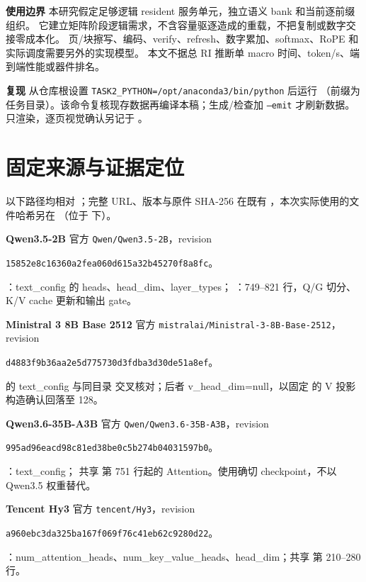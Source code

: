 \documentclass[UTF8,a4paper,11pt]{ctexart}
\newcommand{\para}[1]{\par\textbf{#1}\quad}
\begin{document}
\para{使用边界} 本研究假定足够逻辑 resident 服务单元，独立语义 bank 和当前逐前缀组织。
它建立矩阵阶段逻辑需求，不含容量驱逐造成的重载，不把复制或数字交接零成本化。
页/块擦写、编码、verify、refresh、数字累加、softmax、RoPE 和实际调度需要另外的实现模型。
本文不据总 RI 推断单 macro 时间、token/s、端到端性能或器件排名。

\para{复现} 从仓库根设置 \texttt{TASK2\_PYTHON=/opt/anaconda3/bin/python} 后运行
（前缀为任务目录）。该命令复核现存数据再编译本稿；生成/检查加 \texttt{--emit} 才刷新数据。
 只渲染，逐页视觉确认另记于 。

\clearpage
\section{固定来源与证据定位}
以下路径均相对 ；完整 URL、版本与原件 SHA-256 在既有 ，本次实际使用的文件哈希另在 （位于  下）。

\small
\para{Qwen3.5-2B} 官方 \texttt{Qwen/Qwen3.5-2B}，revision\par
\texttt{15852e8c16360a2fea060d615a32b45270f8a8fc}。\par
{}：text\_config 的 heads、head\_dim、layer\_types；
：749--821 行，Q/G 切分、K/V cache 更新和输出 gate。

\para{Ministral 3 8B Base 2512} 官方 \texttt{mistralai/Ministral-3-8B-Base-2512}，revision\par
\texttt{d4883f9b36aa2e5d775730d3fdba3d30de51a8ef}。\par
{} 的 text\_config 与同目录  交叉核对；后者 v\_head\_dim=null，以固定  的 V 投影构造确认回落至 128。

\para{Qwen3.6-35B-A3B} 官方 \texttt{Qwen/Qwen3.6-35B-A3B}，revision\par
\texttt{995ad96eacd98c81ed38be0c5b274b04031597b0}。\par
{}：text\_config；
共享  第 751 行起的 Attention。使用确切 checkpoint，不以 Qwen3.5 权重替代。

\para{Tencent Hy3} 官方 \texttt{tencent/Hy3}，revision\par
\texttt{a960ebc3da325ba167f069f76c41eb62c9280d22}。\par
{}：num\_attention\_heads、num\_key\_value\_heads、head\_dim；共享  第 210--280 行。
\end{document}
